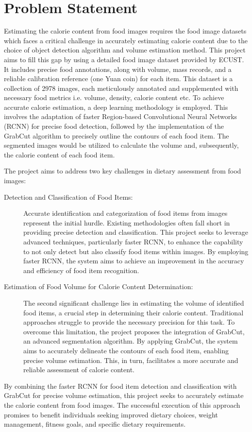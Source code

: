 \documentclass[12pt, a4paper, twoside]{article}
\begin{document}
\section{Problem Statement}
Estimating the calorie content from food images requires the food image datasets which faces a critical challenge in accurately estimating calorie content due to the choice of object detection algorithm and volume estimation method. This project aims to fill this gap by using a detailed food image dataset provided by ECUST\cite{liang}. It includes precise food annotations, along with volume, mass records, and a reliable calibration reference (one Yuan coin) for each item. This dataset is a collection of 2978 images, each meticulously annotated and supplemented with necessary food metrics i.e. volume, density, calorie content etc. To achieve accurate calorie estimation, a deep learning methodology is employed. This involves the adaptation of faster Region-based Convolutional Neural Networks (RCNN) for precise food detection, followed by the implementation of the GrabCut algorithm to precisely outline the contours of each food item. The segmented images would be utilized to calculate the volume and, subsequently, the calorie content of each food item.
\par
The project aims to address two key challenges in dietary assessment from food images:
\begin{description}
	\item[Detection and Classification of Food Items:] Accurate identification and categorization of food items from images represent the initial hurdle. Existing methodologies often fall short in providing precise detection and classification. This project seeks to leverage advanced techniques, particularly faster RCNN, to enhance the capability to not only detect but also classify food items within images. By employing faster RCNN, the system aims to achieve an improvement in the accuracy and efficiency of food item recognition.
	
	\item[Estimation of Food Volume for Calorie Content Determination:] 
	The second significant challenge lies in estimating the volume of identified food items, a crucial step in determining their calorie content. Traditional approaches struggle to provide the necessary precision for this task. To overcome this limitation, the project proposes the integration of GrabCut, an advanced segmentation algorithm. By applying GrabCut, the system aims to accurately delineate the contours of each food item, enabling precise volume estimation. This, in turn, facilitates a more accurate and reliable assessment of calorie content.
\end{description}
\par
By combining the faster RCNN for food item detection and classification with GrabCut for precise volume estimation, this project seeks to accurately estimate the calorie content from food images. The successful execution of this approach promises to benefit individuals seeking improved dietary choices, weight management, fitness goals, and specific dietary requirements.
\end{document}
